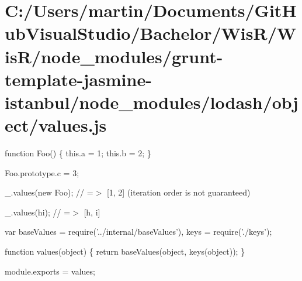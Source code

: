 \hypertarget{_c_1_2_users_2martin_2_documents_2_git_hub_visual_studio_2_bachelor_2_wis_r_2_wis_r_2node_modulece2b201aab675ef2bbca0b83d000263e}{}\section{C\+:/\+Users/martin/\+Documents/\+Git\+Hub\+Visual\+Studio/\+Bachelor/\+Wis\+R/\+Wis\+R/node\+\_\+modules/grunt-\/template-\/jasmine-\/istanbul/node\+\_\+modules/lodash/object/values.\+js}
function Foo() \{ this.\+a = 1; this.\+b = 2; \}

Foo.\+prototype.\+c = 3;

\+\_\+.\+values(new Foo); // =$>$ \mbox{[}1, 2\mbox{]} (iteration order is not guaranteed)

\+\_\+.\+values(\textquotesingle{}hi\textquotesingle{}); // =$>$ \mbox{[}\textquotesingle{}h\textquotesingle{}, \textquotesingle{}i\textquotesingle{}\mbox{]}


\begin{DoxyCodeInclude}
var baseValues = require(\textcolor{stringliteral}{'../internal/baseValues'}),
    keys = require(\textcolor{stringliteral}{'./keys'});

\textcolor{keyword}{function} values(\textcolor{keywordtype}{object}) \{
  \textcolor{keywordflow}{return} baseValues(\textcolor{keywordtype}{object}, keys(\textcolor{keywordtype}{object}));
\}

module.exports = values;
\end{DoxyCodeInclude}
 